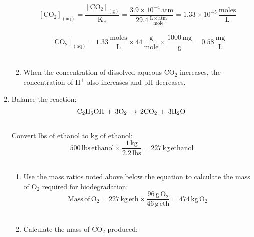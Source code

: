 \documentclass[12pt,letterpaper]{article}
\begin{document}
\begin{enumerate}
\begin{enumerate}
\begin{equation*}
\mathrm{[CO_{2}]_{(aq)} = \frac{[CO_{2}]_{(g)}}{K_H} = \frac{3.9\times 10^{-4}\, atm}{29.4\, \frac{L\times atm}{mole}} = 1.33\times 10^{-5}\, \frac{moles}{L}} 
\end{equation*}\\


\begin{equation*}
\mathrm{[CO_{2}]_{(aq)} = 1.33\, \frac{moles}{L}\times 44\, \frac{g}{mole}\times \frac{1000\, mg}{g} = 0.58\, \frac{mg}{L}} 
\end{equation*}\\

\item When the concentration of dissolved aqueous $\mathrm{CO_2}$ increases, the concentration of $\mathrm{H^+}$ also increases and pH decreases.

\end{enumerate}

\item 

Balance the reaction:\\

\begin{align*}
\cee{\mathrm{C_2H_5OH}}\,  + \,  3\mathrm{O_2}\, \rightarrow \, 2\mathrm{CO_2} \, + \,  3\mathrm{H_2O}
\end{align*}\\


Convert lbs of ethanol to kg of ethanol:\\

\begin{equation*}
\mathrm{500\, lbs\, ethanol \times \frac{1\, kg}{2.2\, lbs} = 227\, kg\, ethanol}
\end{equation*}\\

\begin{enumerate}

\item Use the mass ratios noted above below the equation to calculate the mass of O$_2$ required for biodegradation:\\

\begin{equation*}
\mathrm{Mass\, of\, O_2 = 227\, kg\, eth\times \frac{96\, g\, O_2}{46\, g\, eth} = 474\, kg\, O_2}
\end{equation*}\\



\item Calculate the mass of CO$_2$ produced:\\


\end{enumerate}
\end{enumerate}
\end{document}
